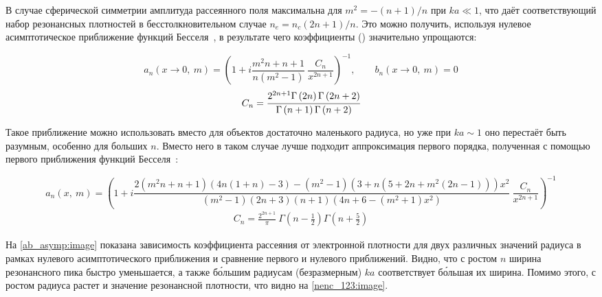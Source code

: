 В случае сферической симметрии амплитуда рассеянного поля максимальна для $m^2 = - (n+ 1) / n$ при $ka \ll 1$, что даёт соответствующий набор резонансных плотностей в бесстолкновительном случае $n_e = n_c(2n + 1) / n$. Это можно получить, используя нулевое асимптотическое приближение функций Бесселя~\cite{boren_huffman}, в результате чего коэффициенты () значительно упрощаются:

    \begin{equation}
        a_n\left( x \to 0,\:m \right) = {\left( 1 + i \frac{m^2n + n + 1 }{n \left( m^2 - 1 \right)} \: \frac{C_n}{x^{2n + 1}}\right)}^{-1}, \qquad b_n\left( x \to 0,\:m \right) = 0
        \label{ab_asymp}
    \end{equation}
    \begin{align*}
		C_n = \cfrac{2^{2n + 1}\Gamma \left(2n \right) \Gamma \left(2n + 2\right)}{\Gamma \left(n + 1\right) \Gamma \left(n + 2\right)}
    \end{align*}

Такое приближение можно использовать вместо  для объектов достаточно маленького радиуса, но уже при $ka \sim 1$ оно перестаёт быть разумным, особенно для больших $n$. Вместо него в таком случае лучше подходит аппроксимация первого порядка, полученная с помощью первого приближения функций Бесселя~\cite{boren_huffman}:

    \begin{equation}
		a_n\left( x ,\:m \right) = {\left( 1 + i \frac{ 2(m^2 n + n + 1) (4n (1 + n) - 3) - (m^2 - 1)(3 + n(5 + 2n + m^2 (2n - 1))) x^2}{ (m^2 - 1)(2n + 3)(n + 1)(4n + 6 - (m^2 + 1)x^2)} \: \frac{C_n}{x^{2n + 1}}\right) }^{-1}
		\label{an_sph_asymp1}
    \end{equation}
	\begin{align*}
		C_n = \frac{2^{2n + 1}}{\pi}\:\Gamma \left(n - \frac{1}{2} \right) \Gamma \left(n + \frac{5}{2} \right)
    \end{align*}

На \autoref{ab_asymp:image} показана зависимость коэффициента рассеяния от электронной плотности для двух различных значений радиуса в рамках нулевого асимптотического приближения и сравнение первого и нулевого приближений. Видно, что с ростом $n$ ширина резонансного пика быстро уменьшается, а также б\'{о}льшим радиусам (безразмерным) $ka$ соответствует б\'{о}льшая их ширина. Помимо этого, с ростом радиуса растет и значение резонансной плотности, что видно на \autoref{nenc_123:image}.

